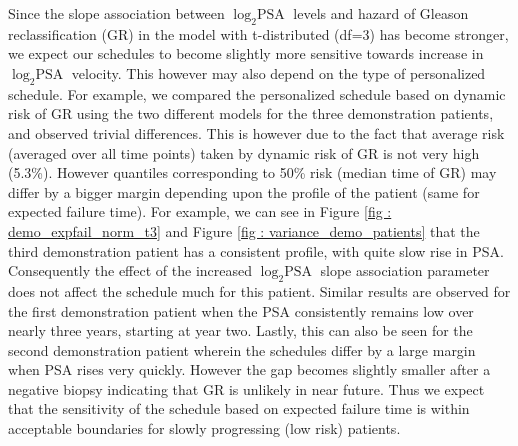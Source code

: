 \begin{enumerate}
	Since the slope association between $\log_2 \mbox{PSA}$ levels and hazard of Gleason reclassification (GR) in the model with t-distributed (df=3) has become stronger, we expect our schedules to become slightly more sensitive towards increase in $\log_2 \mbox{PSA}$ velocity. This however may also depend on the type of personalized schedule. For example, we compared the personalized schedule based on dynamic risk of GR using the two different models for the three demonstration patients, and observed trivial differences. This is however due to the fact that average risk (averaged over all time points) taken by dynamic risk of GR is not very high (5.3\%). However quantiles corresponding to 50\% risk (median time of GR) may differ by a bigger margin depending upon the profile of the patient (same for expected failure time). For example, we can see in Figure \ref{fig : demo_expfail_norm_t3} and Figure \ref{fig : variance_demo_patients} that the third demonstration patient has a consistent profile, with quite slow rise in PSA. Consequently the effect of the increased $\log_2 \mbox{PSA}$ slope association parameter does not affect the schedule much for this patient. Similar results are observed for the first demonstration patient when the PSA consistently remains low over nearly three years, starting at year two. Lastly, this can also be seen for the second demonstration patient wherein the schedules differ by a large margin when PSA rises very quickly. However the gap becomes slightly smaller after a negative biopsy indicating that GR is unlikely in near future. Thus we expect that the sensitivity of the schedule based on expected failure time is within acceptable boundaries for slowly progressing (low risk) patients.


\end{enumerate}
